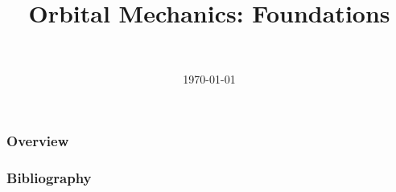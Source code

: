 \documentclass[]{beamer}
\title
[Orbital Mechanics: Foundations]
{Orbital Mechanics: Foundations}
\author[Daniel Topa]{\Topa \\ \TopaEmail}
\institute{\unmmath}
\date{\today}
\begin{document}


\begin{frame}
	\titlepage
\end{frame}
	


\begin{frame}\frametitle{Overview}
	\tableofcontents[hideallsubsections]
\end{frame}

	
%	

{\tiny{
\begin{frame}[allowframebreaks]\frametitle{Bibliography}
	\printbibliography
\end{frame}}}

\begin{frame}
	\titlepage
\end{frame}
\end{document}
